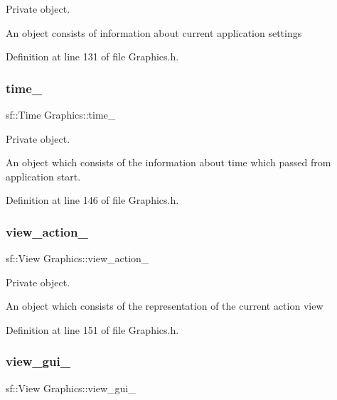 Private object. 

An object consists of information about current application settings 

Definition at line 131 of file Graphics.\+h.

\mbox{\label{classGraphics_ab2983b7d90351c0f7b824ac6f887fd6d}} 
\subsubsection{\texorpdfstring{time\+\_\+}{time\_}}
{\footnotesize\ttfamily sf\+::\+Time Graphics\+::time\+\_\+\hspace{0.3cm}{\ttfamily [private]}}



Private object. 

An object which consists of the information about time which passed from application start. 

Definition at line 146 of file Graphics.\+h.

\mbox{\label{classGraphics_a60792a296f5e93dbd1d086398e20cbd0}} 
\subsubsection{\texorpdfstring{view\+\_\+action\+\_\+}{view\_action\_}}
{\footnotesize\ttfamily sf\+::\+View Graphics\+::view\+\_\+action\+\_\+\hspace{0.3cm}{\ttfamily [private]}}



Private object. 

An object which consists of the representation of the current action view 

Definition at line 151 of file Graphics.\+h.

\mbox{\label{classGraphics_aaca5b237fae17f3166f8f28e4c363e06}} 
\subsubsection{\texorpdfstring{view\+\_\+gui\+\_\+}{view\_gui\_}}
{\footnotesize\ttfamily sf\+::\+View Graphics\+::view\+\_\+gui\+\_\+\hspace{0.3cm}{\ttfamily [private]}}



